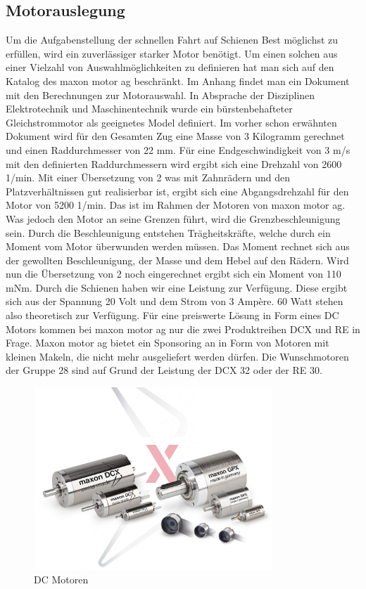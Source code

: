 \documentclass[../../main.tex]{subfiles}
\begin{document}
    \subsection{Motorauslegung}
          Um die Aufgabenstellung der schnellen Fahrt auf Schienen Best möglichst zu erfüllen, wird ein zuverlässiger starker Motor benötigt. Um einen solchen aus einer Vielzahl von Auswahlmöglichkeiten zu definieren hat man sich auf den Katalog des maxon motor ag beschränkt. Im Anhang findet man ein Dokument mit den Berechnungen zur Motorauswahl. In Absprache der Disziplinen Elektrotechnik und Maschinentechnik wurde ein bürstenbehafteter Gleichstrommotor als geeignetes Model definiert. Im vorher schon erwähnten Dokument wird für den Gesamten Zug eine Masse von 3 Kilogramm gerechnet und einen Raddurchmesser von 22 mm. Für eine Endgeschwindigkeit von 3 m/s mit den definierten Raddurchmessern wird ergibt sich eine Drehzahl von 2600 1/min. Mit einer Übersetzung von 2 was mit Zahnrädern und den Platzverhältnissen gut realisierbar ist, ergibt sich eine Abgangsdrehzahl für den Motor von 5200 1/min. Das ist im Rahmen der Motoren von maxon motor ag. Was jedoch den Motor an seine Grenzen führt, wird die Grenzbeschleunigung sein. Durch die Beschleunigung entstehen Trägheitskräfte, welche durch ein Moment vom Motor überwunden werden müssen. Das Moment rechnet sich aus der gewollten Beschleunigung, der Masse und dem Hebel auf den Rädern. Wird nun die Übersetzung von 2 noch eingerechnet ergibt sich ein Moment von 110 mNm. Durch die Schienen haben wir eine Leistung zur Verfügung. Diese ergibt sich aus der Spannung 20 Volt und dem Strom von 3 Ampère. 60 Watt stehen also theoretisch zur Verfügung. Für eine preiswerte Lösung in Form eines DC Motors kommen bei maxon motor ag nur die zwei Produktreihen DCX und RE in Frage. Maxon motor ag bietet ein Sponsoring an in Form von Motoren mit kleinen Makeln, die nicht mehr ausgeliefert werden dürfen. Die Wunschmotoren der Gruppe 28 sind auf Grund der Leistung der DCX 32 oder der RE 30.

    \begin{figure}[H]
        \centering
        \includegraphics[width=0.8\textwidth]{../../images/Kran/Motors.JPG}
        \caption {DC Motoren}
        \label{fig:et_komponenten}
    \end{figure}


    
\end{document}
